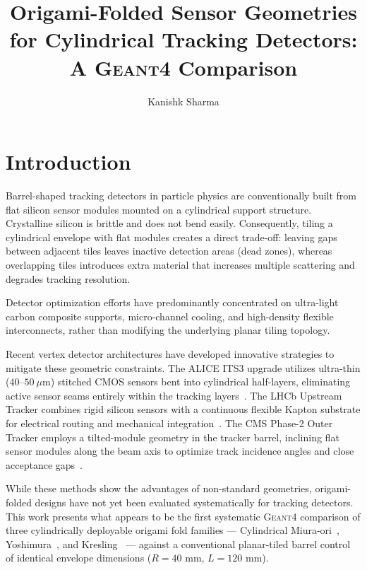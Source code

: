 \documentclass[a4paper,11pt]{article}
\title{\boldmath Origami-Folded Sensor Geometries for Cylindrical Tracking Detectors: A \textsc{Geant4} Comparison}
\author{Kanishk Sharma}
\affiliation{Air Force Bal Bharti School}
\begin{document}
\maketitle
\flushbottom

\section{Introduction}
\label{sec:intro}

Barrel-shaped tracking detectors in particle physics are conventionally built from flat silicon sensor modules mounted on a cylindrical support structure. Crystalline silicon is brittle and does not bend easily. Consequently, tiling a cylindrical envelope with flat modules creates a direct trade-off: leaving gaps between adjacent tiles leaves inactive detection areas (dead zones), whereas overlapping tiles introduces extra material that increases multiple scattering and degrades tracking resolution.

Detector optimization efforts have predominantly concentrated on ultra-light carbon composite supports, micro-channel cooling, and high-density flexible interconnects, rather than modifying the underlying planar tiling topology.

Recent vertex detector architectures have developed innovative strategies to mitigate these geometric constraints. The ALICE ITS3 upgrade utilizes ultra-thin ($40$--$50\ \mu\text{m}$) stitched CMOS sensors bent into cylindrical half-layers, eliminating active sensor seams entirely within the tracking layers~\cite{ALICE2024, Sonneveld2023}. The LHCb Upstream Tracker combines rigid silicon sensors with a continuous flexible Kapton substrate for electrical routing and mechanical integration~\cite{Lionetto2014}. The CMS Phase-2 Outer Tracker employs a tilted-module geometry in the tracker barrel, inclining flat sensor modules along the beam axis to optimize track incidence angles and close acceptance gaps~\cite{CMS2017}.

While these methods show the advantages of non-standard geometries, origami-folded designs have not yet been evaluated systematically for tracking detectors. This work presents what appears to be the first systematic \textsc{Geant4} comparison of three cylindrically deployable origami fold families --- Cylindrical Miura-ori~\cite{Miura1985}, Yoshimura~\cite{Yoshimura1955}, and Kresling~\cite{Kresling2008} --- against a conventional planar-tiled barrel control of identical envelope dimensions ($R = 40\text{ mm}$, $L = 120\text{ mm}$).
\end{document}
